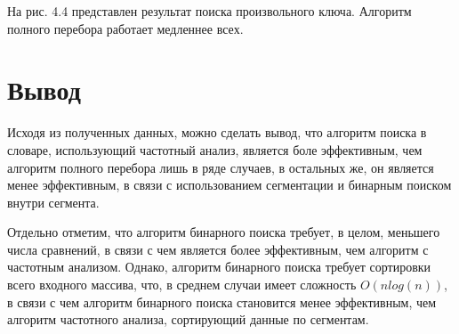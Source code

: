 
На рис. 4.4 представлен результат поиска произвольного ключа.
Алгоритм полного перебора работает медленнее всех.



\section*{Вывод}

Исходя из полученных данных, можно сделать вывод, что алгоритм поиска в словаре, использующий частотный анализ, является боле эффективным, чем алгоритм полного перебора лишь в ряде случаев, в остальных же, он является менее эффективным, в связи с использованием сегментации и бинарным поиском внутри сегмента.

Отдельно отметим, что алгоритм бинарного поиска требует, в целом, меньшего числа сравнений, в связи с чем является более эффективным, чем алгоритм с частотным анализом. Однако, алгоритм бинарного поиска требует сортировки всего входного массива, что, в среднем случаи имеет сложность $O(nlog(n))$, в связи с чем алгоритм бинарного поиска становится менее эффективным, чем алгоритм частотного анализа, сортирующий данные по сегментам.
